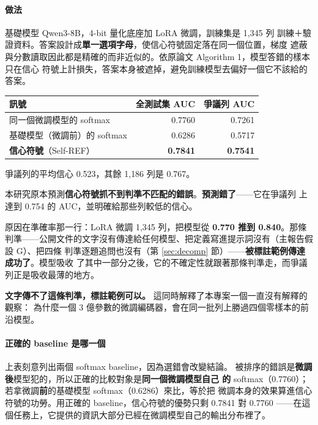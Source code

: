 \documentclass[11pt,a4paper]{ctexart}
\begin{document}
\paragraph{做法} 基礎模型 Qwen3-8B，4-bit 量化底座加 LoRA 微調，訓練集是 1{,}345 列
訓練＋驗證資料。答案設計成\textbf{單一選項字母}，使信心符號固定落在同一個位置，梯度
遮蔽與分數讀取因此都是精確的而非近似的。依原論文 Algorithm 1，模型答錯的樣本只在信心
符號上計損失，答案本身被遮掉，避免訓練模型去偏好一個它不該給的答案。

\begin{table}[h]
\centering\small
\begin{tabular}{@{}lrr@{}}
\toprule
訊號 & 全測試集 AUC & 爭議列 AUC \\
\midrule
同一個微調模型的 softmax & 0.7760 & 0.7261 \\
基礎模型（微調前）的 softmax & 0.6286 & 0.5717 \\
\rowcolor{green!12}
\textbf{信心符號}（Self-REF） & \textbf{0.7841} & \textbf{0.7541} \\
\bottomrule
\end{tabular}
\end{table}

爭議列的平均信心 0.523，其餘 1{,}186 列是 0.767。

\begin{tcolorbox}[colback=red!5, colframe=red!50, title=本節的假設被推翻，而推翻它的理由比假設本身重要]
本研究原本預測\textbf{信心符號抓不到判準不匹配的錯誤}。\textbf{預測錯了}——它在爭議列
上達到 0.754 的 AUC，並明確給那些列較低的信心。

\medskip
原因在準確率那一行：LoRA 微調 1{,}345 列，把模型從 \textbf{0.770 推到 0.840}。那條
判準——公開文件的文字沒有傳達給任何模型、把定義寫進提示詞沒有（主報告假設 G）、把四條
判準逐題追問也沒有（第 \ref{sec:decomp} 節）——\textbf{被標註範例傳達成功了}。模型吸收
了其中一部分之後，它的不確定性就跟著那條判準走，而爭議列正是吸收最薄的地方。

\medskip
\textbf{文字傳不了這條判準，標註範例可以。} 這同時解釋了本專案一個一直沒有解釋的觀察：
為什麼一個 3 億參數的微調編碼器，會在同一批列上勝過四個零樣本的前沿模型。
\end{tcolorbox}

\paragraph{正確的 baseline 是哪一個} 上表刻意列出兩個 softmax baseline，因為選錯會改變結論。
被排序的錯誤是\textbf{微調後}模型犯的，所以正確的比較對象是\textbf{同一個微調模型自己
的} softmax（0.7760）；若拿微調\textbf{前}的基礎模型 softmax（0.6286）來比，等於把
微調本身的效果算進信心符號的功勞。用正確的 baseline，信心符號的優勢只剩 0.7841 對 0.7760
——在這個任務上，它提供的資訊大部分已經在微調模型自己的輸出分布裡了。
\end{document}

